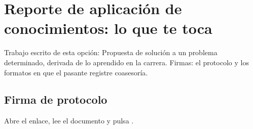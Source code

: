 \section{Reporte de aplicación de conocimientos: lo que te toca}
Trabajo escrito de esta opción: Propuesta de solución a un problema determinado, derivada de lo aprendido en la carrera. Firmas: el protocolo y los formatos en que el pasante registre coasesoría.
\subsection{Firma de protocolo}
Abre el enlace, lee el documento y pulsa .
